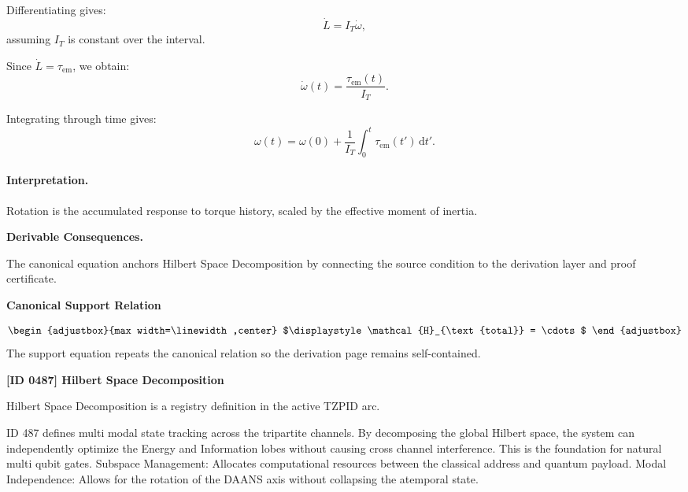 Differentiating gives:
\begin{equation}
\dot{L}
=
I_T\dot{\omega},
\end{equation}
assuming $I_T$ is constant over the interval.

Since $\dot{L}=\tau_{\mathrm{em}}$, we obtain:
\begin{equation}
\dot{\omega}(t)
=
\frac{\tau_{\mathrm{em}}(t)}{I_T}.
\end{equation}

Integrating through time gives:
\begin{equation}
\boxed{
\omega(t)
=
\omega(0)
+
\frac{1}{I_T}
\int_0^t
\tau_{\mathrm{em}}(t')
\,\mathrm{d}t' .
}
\end{equation}

\paragraph{Interpretation.}
Rotation is the accumulated response to torque history, scaled by the effective moment of inertia.

\par\vspace{0.35em}
\noindent\textbf{Derivable Consequences.}\quad
\begingroup
\footnotesize
\raggedright
The canonical equation anchors Hilbert Space Decomposition by connecting the source condition to the derivation layer and proof certificate.
\par\endgroup

\noindent\textbf{Canonical Support Relation}\par
\[
\begin{adjustbox}{max width=\linewidth,center}
$\displaystyle
\mathcal{H}_{\text{total}} = \cdots
$
\end{adjustbox}
\]
\noindent The support equation repeats the canonical relation so the derivation page remains self-contained.\par

\clearpage
\noindent\textbf{[ID 0487] Hilbert Space Decomposition}\par
\vspace{0.35em}
\begingroup\small
{}
Hilbert Space Decomposition is a registry definition in the active TZPID arc.

ID 487 defines multi modal state tracking across the tripartite channels. By decomposing the global Hilbert space, the system can independently optimize the Energy and Information lobes without causing cross channel interference. This is the foundation for natural multi qubit gates. Subspace Management: Allocates computational resources between the classical address and quantum payload. Modal Independence: Allows for the rotation of the DAANS axis without collapsing the atemporal state.

